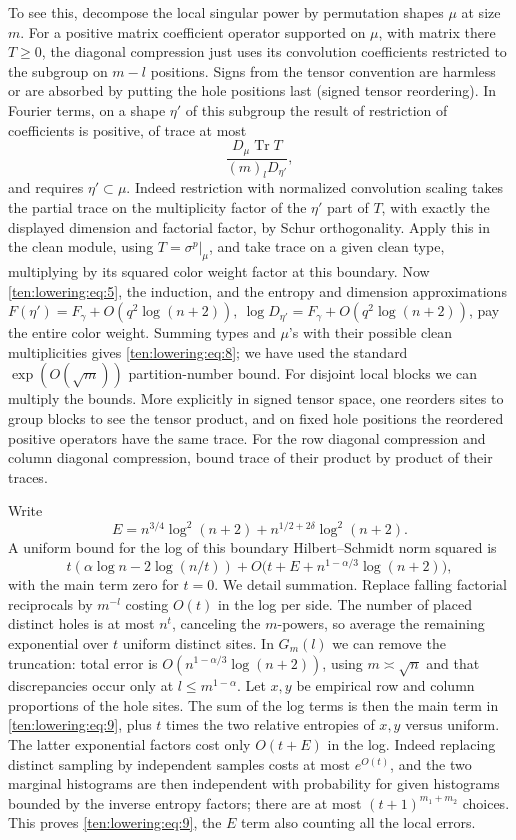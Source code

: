 To see this, decompose the local singular power by permutation shapes \(\mu\) at size \(m\). For a positive matrix coefficient operator supported on \(\mu\), with matrix there \(T\ge0\), the diagonal compression just uses its convolution coefficients restricted to the subgroup on \(m-l\) positions. Signs from the tensor convention are harmless or are absorbed by putting the hole positions last (signed tensor reordering). In Fourier terms, on a shape \(\eta'\) of this subgroup the result of restriction of coefficients is positive, of trace at most
\[
               \frac{D_\mu\operatorname{Tr}T}{(m)_l D_{\eta'}},
\]
and requires \(\eta'\subset\mu\). Indeed restriction with normalized convolution scaling takes the partial trace on the multiplicity factor of the \(\eta'\) part of \(T\), with exactly the displayed dimension and factorial factor, by Schur orthogonality. Apply this in the clean module, using \(T=\sigma^p|_\mu\), and take trace on a given clean type, multiplying by its squared color weight factor at this boundary. Now \eqref{ten:lowering:eq:5}, the induction, and the entropy and dimension approximations \(F(\eta')=F_\gamma+O(q^2\log(n+2)),\ \log D_{\eta'}=F_\gamma+O(q^2\log(n+2))\), pay the entire color weight. Summing types and \(\mu\)'s with their possible clean multiplicities gives \eqref{ten:lowering:eq:8}; we have used the standard \(\exp(O(\sqrt m))\) partition-number bound. For disjoint local blocks we can multiply the bounds. More explicitly in signed tensor space, one reorders sites to group blocks to see the tensor product, and on fixed hole positions the reordered positive operators have the same trace. For the row diagonal compression and column diagonal compression, bound trace of their product by product of their traces.

Write
\[
             E=n^{3/4} \log^2(n+2)+n^{1/2+2\delta}\log^2(n+2).
\]
A uniform bound for the log of this boundary Hilbert--Schmidt norm squared is
\begin{equation}
 t(\alpha\log n-2\log(n/t))+O\big(t+E+n^{1-\alpha/3}\log(n+2)\big),        \label{ten:lowering:eq:9}
\end{equation}
with the main term zero for \(t=0\). We detail summation. Replace falling factorial reciprocals by \(m^{-l}\) costing \(O(t)\) in the log per side. The number of placed distinct holes is at most \(n^t\), canceling the \(m\)-powers, so average the remaining exponential over \(t\) uniform distinct sites. In \(G_m(l)\) we can remove the truncation: total error is \(O(n^{1-\alpha/3}\log(n+2))\), using \(m\asymp\sqrt n\) and that discrepancies occur only at \(l\le m^{1-\alpha}\). Let \(x,y\) be empirical row and column proportions of the hole sites. The sum of the log terms is then the main term in \eqref{ten:lowering:eq:9}, plus \(t\) times the two relative entropies of \(x,y\) versus uniform. The latter exponential factors cost only \(O(t+E)\) in the log. Indeed replacing distinct sampling by independent samples costs at most \(e^{O(t)}\), and the two marginal histograms are then independent with probability for given histograms bounded by the inverse entropy factors; there are at most \((t+1)^{m_1+m_2}\) choices. This proves \eqref{ten:lowering:eq:9}, the \(E\) term also counting all the local errors.

